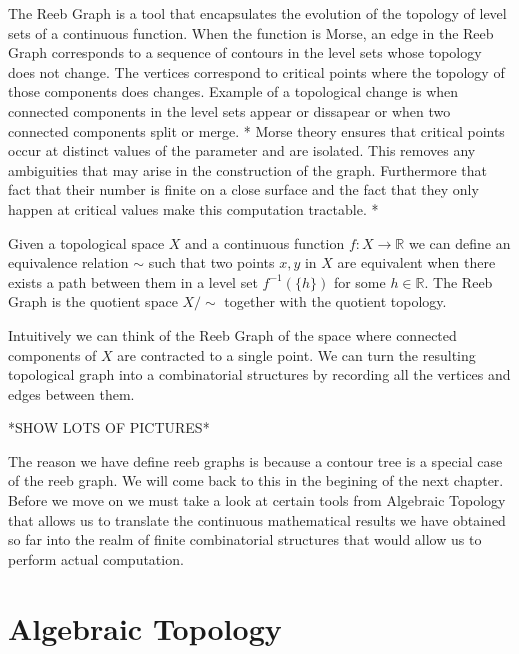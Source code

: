 The Reeb Graph is a tool that encapsulates the evolution of the topology of level sets of a continuous function. When the function is Morse, an edge in the Reeb Graph corresponds to a sequence of contours in the level sets whose topology does not change. The vertices correspond to critical points where the topology of those components does changes. Example of a topological change is when connected components in the level sets appear or dissapear or when two connected components split or merge. * Morse theory ensures that critical points occur at distinct values of the parameter and are isolated. This removes any ambiguities that may arise in the construction of the graph. Furthermore that fact that their number is finite on a close surface and the fact that they only happen at critical values make this computation tractable. *

\begin{defn}
Given a topological space $X$ and a continuous function $f: X \to \mathbb{R}$ we can define an equivalence relation $\sim$ such that two points $x, y$ in $X$ are equivalent when there exists a path between them in a level set $f^{-1}(\{h\})$ for some $h \in \mathbb{R}$. The Reeb Graph is the quotient space $X \big/ \sim$ together with the quotient topology.
\end{defn}

Intuitively we can think of the Reeb Graph of the space where connected components of $X$ are contracted to a single point. We can turn the resulting topological graph into a combinatorial structures by recording all the vertices and edges between them.

*SHOW LOTS OF PICTURES*

The reason we have define reeb graphs is because a contour tree is a special case of the reeb graph. We will come back to this in the begining of the next chapter. Before we move on we must take a look at certain tools from Algebraic Topology that allows us to translate the continuous mathematical results we have obtained so far into the realm of finite combinatorial structures that would allow us to perform actual computation.

\section{Algebraic Topology}

